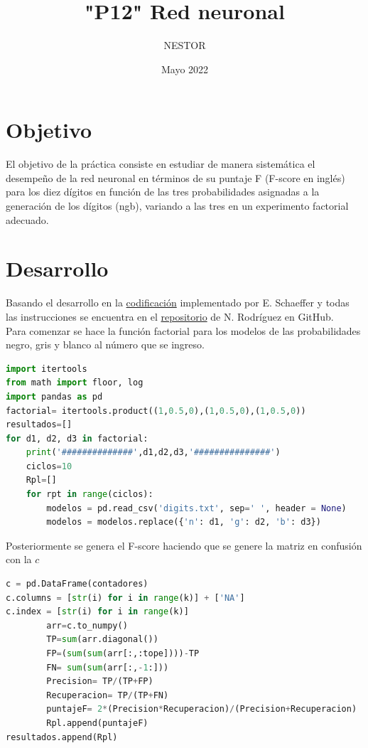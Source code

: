 \documentclass{article}
\title{"P12" Red neuronal}
\author{NESTOR}
\date {Mayo 2022}
\begin{document}
\maketitle

\section{Objetivo}\label{obj}
El objetivo de la práctica consiste en estudiar de manera sistemática el desempeño de la red neuronal en términos de su puntaje F (F-score en inglés) para los diez dígitos en función de las tres probabilidades asignadas a la generación de los dígitos (ngb), variando a las tres en un experimento factorial adecuado. \cite{elisa1}

\section{Desarrollo}\label{des}
Basando el desarrollo en la \href{https://github.com/satuelisa/Simulation/blob/master/NeuralNetwork/perceptron.py}{codificación} implementado por E. Schaeffer \cite{elisa1} y todas las instrucciones se encuentra en el \href{https://github.com/NestorZeus/SIMULACION-COMPUTACIONAL-DE-NANOMATERIALES/tree/main/P12}{repositorio} de N. Rodríguez en GitHub.\\

Para comenzar se hace la función factorial para los modelos de las probabilidades negro, gris y blanco al número que se ingreso.

\begin{lstlisting}[caption=Generamos la función, language=Python]
import itertools
from math import floor, log
import pandas as pd
factorial= itertools.product((1,0.5,0),(1,0.5,0),(1,0.5,0))
resultados=[]
for d1, d2, d3 in factorial:
    print('##############',d1,d2,d3,'###############')
    ciclos=10
    Rpl=[]
    for rpt in range(ciclos):
        modelos = pd.read_csv('digits.txt', sep=' ', header = None)
        modelos = modelos.replace({'n': d1, 'g': d2, 'b': d3})
\end{lstlisting}

Posteriormente se genera el F-score haciendo que se genere la matriz en confusión con la $c$ 

\begin{lstlisting}[caption=Generamos F-score, label=codigo2, language=Python]
c = pd.DataFrame(contadores)
c.columns = [str(i) for i in range(k)] + ['NA']
c.index = [str(i) for i in range(k)]
        arr=c.to_numpy()
        TP=sum(arr.diagonal())
        FP=(sum(sum(arr[:,:tope])))-TP
        FN= sum(sum(arr[:,-1:]))
        Precision= TP/(TP+FP)
        Recuperacion= TP/(TP+FN)
        puntajeF= 2*(Precision*Recuperacion)/(Precision+Recuperacion)
        Rpl.append(puntajeF)
resultados.append(Rpl)
\end{lstlisting}
\end{document}
